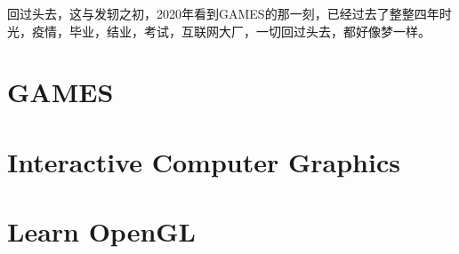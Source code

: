 回过头去，这与发轫之初，2020年看到GAMES的那一刻，已经过去了整整四年时光，疫情，毕业，结业，考试，互联网大厂，一切回过头去，都好像梦一样。

\section{GAMES}

\section{Interactive Computer Graphics}

\section{Learn OpenGL}


